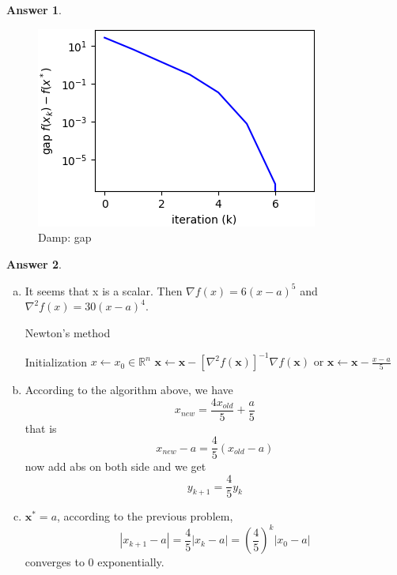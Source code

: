 \documentclass{article}
\theoremstyle{definition}
\newtheorem{ans}{Answer}
\begin{document}
\begin{ans}
\begin{enumerate}[(a)]
\begin{figure}[h]
\begin{minipage}[t]{0.33\linewidth}
					\includegraphics[width=1\linewidth]{../figures/1b/dnt_gap}
					\caption{Damp: gap}
					\label{p15}
				\end{minipage}		
			\end{figure}
		\end{enumerate}
	\end{ans}
	\begin{ans}
		~
		
		\begin{enumerate}[(a)]
			\item It seems that x is a scalar. Then $\nabla f(x)=6(x-a)^5$ and $\nabla^2 f(x)=30(x-a)^4$.
			\begin{algorithm}
				\caption{Newton's method}
				Initialization $x\gets x_0\in \mathbb{R}^n$\;
				{
					$\boldsymbol{x}\gets\boldsymbol{x}-[\nabla^2 f(\boldsymbol{x})]^{-1}\nabla f(\boldsymbol{x})$\;
					or $\boldsymbol{x}\gets\boldsymbol{x}-\frac{x-a}{5}$\;
				}
			\end{algorithm}
			\item According to the algorithm above, we have 
			$$
			x_{new} = \frac{4x_{old}}{5}+\frac{a}{5}
			$$
			that is 
			$$
			x_{new} - a = \frac{4}{5}(x_{old} - a)
			$$ 
			now add abs on both side and we get 
			$$
			y_{k+1}=\frac{4}{5}y_k
			$$
			\item $\boldsymbol{x^*}=a$, according to the previous problem, 
			$$
			|x_{k+1}-a|=\frac{4}{5}|x_k-a|=(\frac{4}{5})^k|x_0-a|
			$$
			converges to 0 exponentially. 
		\end{enumerate}
	\end{ans}
\end{document}
